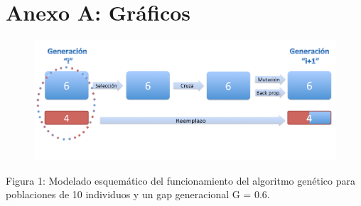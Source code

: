 \documentclass[%
    final,
    reprint,
    notitlepage,
    narroweqnarray,
    inline,
    twoside,
    invited
    ]{ieee}
\begin{document}


\clearpage
\onecolumn

\section*{Anexo A: Gráficos}

\begin{figure}[H]
\begin{center}
\includegraphics[scale=1.90]{./images/AlgGenModelado.png}
\label{modelado}
\end{center}
\end{figure}

\begin{center}
\par Figura 1: Modelado esquemático del funcionamiento del algoritmo genético para poblaciones de 10 individuos y un gap generacional G = 0.6.
\end{center}


\end{document}

